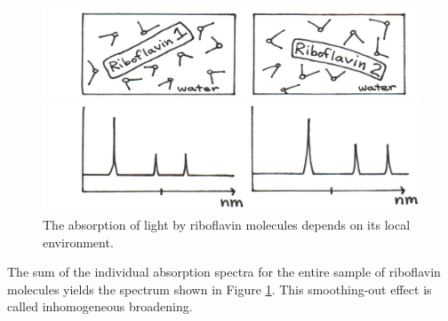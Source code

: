 \begin{figure}[h]
	\centering
	\begin{minipage}[c]{1.0\textwidth}
	\includegraphics[width=\textwidth]{./figures/Topic6/Fig6-15a.jpg}
	\end{minipage}
	\begin{minipage}[c]{1.0\textwidth}
	\includegraphics[width=\textwidth]{./figures/Topic6/Fig6-15b.jpg}
	\end{minipage}
	\caption{The absorption of light by riboflavin molecules depends on its local environment.}
	\label{Fig6-15}
\end{figure} 
The sum of the individual absorption spectra for the entire sample of riboflavin molecules yields the spectrum shown in Figure \ref{Fig6-15}.  This smoothing-out effect is called inhomogeneous broadening. 
